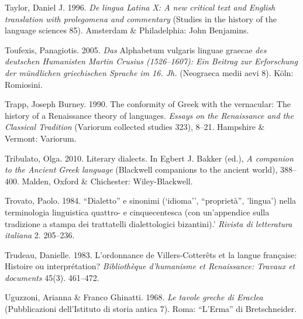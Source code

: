 \begin{styleStandard}
Taylor, Daniel J. 1996. \textit{De lingua Latina X: A new critical text and English translation with prolegomena and commentary} (Studies in the history of the language sciences 85). Amsterdam \& Philadelphia: John Benjamins.
\end{styleStandard}

\begin{styleStandard}
Toufexis, Panagiotis. 2005. \textit{Das }Alphabetum vulgaris linguae graecae\textit{ des deutschen Humanisten Martin Crusius (1526–1607): Ein Beitrag zur Erforschung der mündlichen griechischen Sprache im 16. Jh.} (Neograeca medii aevi 8). Köln: Romiosini.
\end{styleStandard}

\begin{styleStandard}
Trapp, Joseph Burney. 1990. The conformity of Greek with the vernacular: The history of a Renaissance theory of languages. \textit{Essays on the Renaissance and the Classical Tradition} (Variorum collected studies 323), 8–21. Hampshire \& Vermont: Variorum.
\end{styleStandard}

\begin{styleStandard}
Tribulato, Olga. 2010. Literary dialects. In Egbert J. Bakker (ed.), \textit{A companion to the Ancient Greek language} (Blackwell companions to the ancient world), 388–400. Malden, Oxford \& Chichester: Wiley-Blackwell.
\end{styleStandard}

\begin{styleStandard}
Trovato, Paolo. 1984. “Dialetto” e sinonimi (‘idioma’’, “proprietà”, ’lingua’) nella terminologia linguistica quattro- e cinquecentesca (con un’appendice sulla tradizione a stampa dei trattatelli dialettologici bizantini).’ \textit{Rivista di letteratura italiana} 2. 205–236.
\end{styleStandard}

\begin{styleStandard}
Trudeau, Danielle. 1983. L’ordonnance de Villers-Cotterêts et la langue française: Histoire ou interprétation? \textit{Bibliothèque d’humanisme et Renaissance: Travaux et documents} 45(3). 461–472.
\end{styleStandard}

\begin{styleStandard}
Uguzzoni, Arianna \& Franco Ghinatti. 1968. \textit{Le tavole greche di Eraclea} (Pubblicazioni dell’Istituto di storia antica 7). Roma: “L’Erma” di Bretschneider.
\end{styleStandard}

